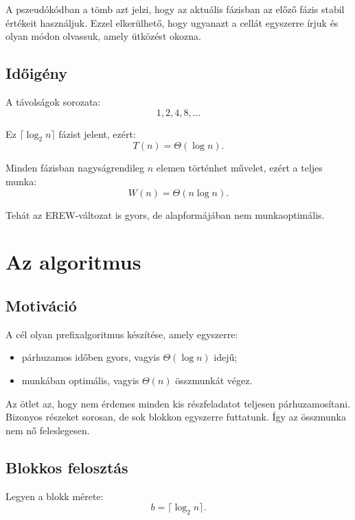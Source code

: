 
A pszeudókódban a  tömb azt jelzi, hogy az aktuális fázisban az előző fázis stabil értékeit használjuk. Ezzel elkerülhető, hogy ugyanazt a cellát egyszerre írjuk és olyan módon olvassuk, amely ütközést okozna.

\subsection{Időigény}

A távolságok sorozata:
\[
  1,2,4,8,\ldots
\]

Ez $\lceil\log_2 n\rceil$ fázist jelent, ezért:
\[
  T(n)=\Theta(\log n).
\]

Minden fázisban nagyságrendileg $n$ elemen történhet művelet, ezért a teljes munka:
\[
  W(n)=\Theta(n\log n).
\]

Tehát az EREW-változat is gyors, de alapformájában nem munkaoptimális.

\section{Az  algoritmus}

\subsection{Motiváció}

A cél olyan prefixalgoritmus készítése, amely egyszerre:

\begin{itemize}
  \item párhuzamos időben gyors, vagyis $\Theta(\log n)$ idejű;
  \item munkában optimális, vagyis $\Theta(n)$ összmunkát végez.
\end{itemize}

Az ötlet az, hogy nem érdemes minden kis részfeladatot teljesen párhuzamosítani. Bizonyos részeket sorosan, de sok blokkon egyszerre futtatunk. Így az összmunka nem nő feleslegesen.

\subsection{Blokkos felosztás}

Legyen a blokk mérete:
\[
  b=\lceil\log_2 n\rceil.
\]

